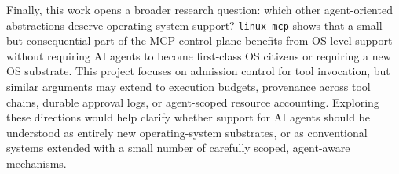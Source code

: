 Finally, this work opens a broader research question: which other agent-oriented abstractions deserve operating-system support?
\texttt{linux-mcp} shows that a small but consequential part of the MCP control plane benefits from OS-level support without requiring AI agents to become first-class OS citizens or requiring a new OS substrate.
This project focuses on admission control for tool invocation, but similar arguments may extend to execution budgets, provenance across tool chains, durable approval logs, or agent-scoped resource accounting.
Exploring these directions would help clarify whether support for AI agents should be understood as entirely new operating-system substrates, or as conventional systems extended with a small number of carefully scoped, agent-aware mechanisms.